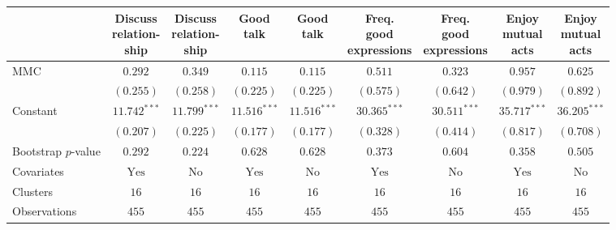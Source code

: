 
\begin{tabular}{l c c c c c c c c}
\toprule
 & \shortstack{Discuss \\ relation- \\ ship} & \shortstack{Discuss \\ relation- \\ ship} & \shortstack{Good \\ talk} & \shortstack{Good \\ talk} & \shortstack{Freq. \\ good \\ expressions} & \shortstack{Freq. \\ good \\ expressions} & \shortstack{Enjoy \\ mutual \\ acts} & \shortstack{Enjoy \\ mutual \\ acts} \\
\midrule
MMC                 & $0.292$        & $0.349$        & $0.115$        & $0.115$        & $0.511$        & $0.323$        & $0.957$        & $0.625$        \\
                    & $(0.255)$      & $(0.258)$      & $(0.225)$      & $(0.225)$      & $(0.575)$      & $(0.642)$      & $(0.979)$      & $(0.892)$      \\
Constant            & $11.742^{***}$ & $11.799^{***}$ & $11.516^{***}$ & $11.516^{***}$ & $30.365^{***}$ & $30.511^{***}$ & $35.717^{***}$ & $36.205^{***}$ \\
                    & $(0.207)$      & $(0.225)$      & $(0.177)$      & $(0.177)$      & $(0.328)$      & $(0.414)$      & $(0.817)$      & $(0.708)$      \\
\midrule
Bootstrap $p$-value & $0.292$        & $0.224$        & $0.628$        & $0.628$        & $0.373$        & $0.604$        & $0.358$        & $0.505$        \\
Covariates          & $\textrm{Yes}$ & $\textrm{No}$  & $\textrm{Yes}$ & $\textrm{No}$  & $\textrm{Yes}$ & $\textrm{No}$  & $\textrm{Yes}$ & $\textrm{No}$  \\
Clusters            & $16$           & $16$           & $16$           & $16$           & $16$           & $16$           & $16$           & $16$           \\
Observations        & $455$          & $455$          & $455$          & $455$          & $455$          & $455$          & $455$          & $455$          \\

\end{tabular}
